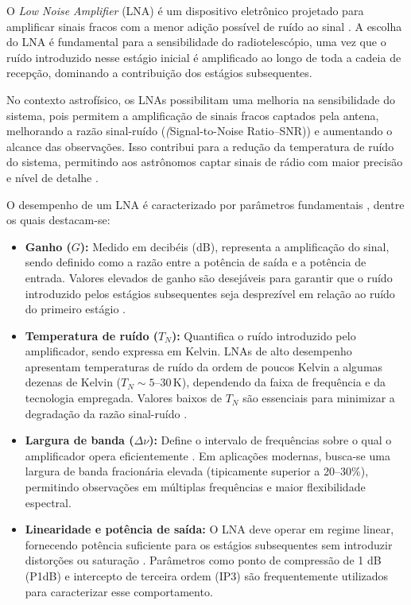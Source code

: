O \textit{Low Noise Amplifier} (LNA) é um dispositivo eletrônico projetado para amplificar sinais fracos com a menor adição possível de ruído ao sinal \cite{hao2025lna}. A escolha do LNA é fundamental para a sensibilidade do radiotelescópio, uma vez que o ruído introduzido nesse estágio inicial é amplificado ao longo de toda a cadeia de recepção, dominando a contribuição dos estágios subsequentes.

No contexto astrofísico, os LNAs possibilitam uma melhoria na sensibilidade do sistema, pois permitem a amplificação de sinais fracos captados pela antena, melhorando a razão sinal-ruído (\textit(Signal-to-Noise Ratio--SNR)) e aumentando o alcance das observações. Isso contribui para a redução da temperatura de ruído do sistema, permitindo aos astrônomos captar sinais de rádio com maior precisão e nível de detalhe \cite{hao2025lna}.

O desempenho de um LNA é caracterizado por parâmetros fundamentais \cite{schweber2013lna,hao2025lna}, dentre os quais destacam-se:

\begin{itemize}
    \item \textbf{Ganho ($G$):} Medido em decibéis (dB), representa a amplificação do sinal, sendo definido como a razão entre a potência de saída e a potência de entrada. Valores elevados de ganho  são desejáveis para garantir que o ruído introduzido pelos estágios subsequentes seja desprezível em relação ao ruído do primeiro estágio \cite{schweber2013lna}.

    \item \textbf{Temperatura de ruído ($T_N$):} Quantifica o ruído introduzido pelo amplificador, sendo expressa em Kelvin. LNAs de alto desempenho apresentam temperaturas de ruído da ordem de poucos Kelvin a algumas dezenas de Kelvin ($T_N \sim 5$–$30\,\mathrm{K}$), dependendo da faixa de frequência e da tecnologia empregada. Valores baixos de $T_N$ são essenciais para minimizar a degradação da razão sinal-ruído \cite{hao2025lna}.

    \item \textbf{Largura de banda ($\Delta \nu$):} Define o intervalo de frequências sobre o qual o amplificador opera eficientemente \cite{schweber2013lna}. Em aplicações modernas, busca-se uma largura de banda fracionária elevada (tipicamente superior a 20–30\%), permitindo observações em múltiplas frequências e maior flexibilidade espectral.

    \item \textbf{Linearidade e potência de saída:} O LNA deve operar em regime linear, fornecendo potência suficiente para os estágios subsequentes sem introduzir distorções ou saturação \cite{schweber2013lna}. Parâmetros como ponto de compressão de 1 dB (P1dB) e intercepto de terceira ordem (IP3) são frequentemente utilizados para caracterizar esse comportamento.
\end{itemize}

